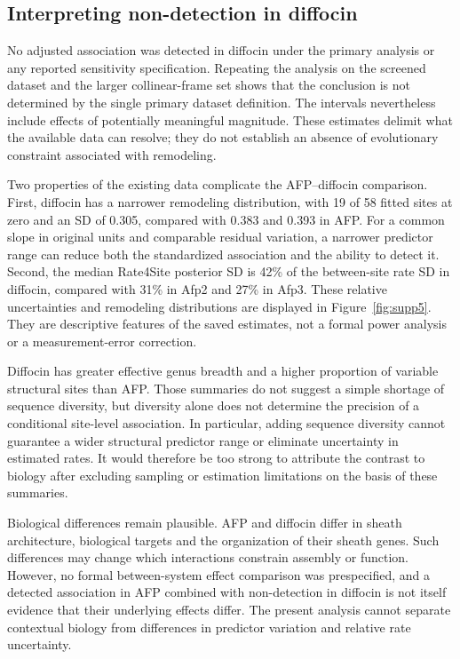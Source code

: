 \documentclass[11pt,a4paper]{article}
\begin{document}
\subsection{Interpreting non-detection in diffocin}

No adjusted association was detected in diffocin under the primary analysis or any reported sensitivity specification. Repeating the analysis on the screened dataset and the larger collinear-frame set shows that the conclusion is not determined by the single primary dataset definition. The intervals nevertheless include effects of potentially meaningful magnitude. These estimates delimit what the available data can resolve; they do not establish an absence of evolutionary constraint associated with remodeling.

Two properties of the existing data complicate the AFP--diffocin comparison. First, diffocin has a narrower remodeling distribution, with 19 of 58 fitted sites at zero and an SD of 0.305, compared with 0.383 and 0.393 in AFP. For a common slope in original units and comparable residual variation, a narrower predictor range can reduce both the standardized association and the ability to detect it. Second, the median Rate4Site posterior SD is 42\% of the between-site rate SD in diffocin, compared with 31\% in Afp2 and 27\% in Afp3. These relative uncertainties and remodeling distributions are displayed in Figure~\ref{fig:supp5}. They are descriptive features of the saved estimates, not a formal power analysis or a measurement-error correction.

Diffocin has greater effective genus breadth and a higher proportion of variable structural sites than AFP. Those summaries do not suggest a simple shortage of sequence diversity, but diversity alone does not determine the precision of a conditional site-level association. In particular, adding sequence diversity cannot guarantee a wider structural predictor range or eliminate uncertainty in estimated rates. It would therefore be too strong to attribute the contrast to biology after excluding sampling or estimation limitations on the basis of these summaries.

Biological differences remain plausible. AFP and diffocin differ in sheath architecture, biological targets and the organization of their sheath genes.\cite{ref2,ref3} Such differences may change which interactions constrain assembly or function. However, no formal between-system effect comparison was prespecified, and a detected association in AFP combined with non-detection in diffocin is not itself evidence that their underlying effects differ. The present analysis cannot separate contextual biology from differences in predictor variation and relative rate uncertainty.
\end{document}
